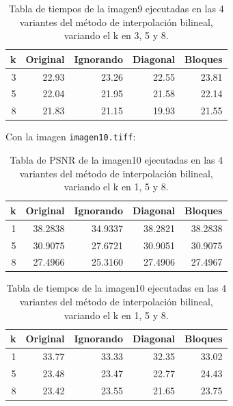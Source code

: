 \documentclass[a4paper]{article}
\newcounter{col}
\begin{document}
\begin{table}[H]
\centering
\begin{tabular}{|r|r|r|r|r|}
\hline
\multicolumn{1}{|c|}{k} & \multicolumn{1}{c|}{Original} & \multicolumn{1}{c|}{Ignorando} & \multicolumn{1}{c|}{Diagonal} & \multicolumn{1}{c|}{Bloques} \\ \hline
3 &  22.93 &  23.26 &  22.55 & 23.81 \\ \hline
5 & 22.04 & 21.95 & 21.58 &  22.14 \\ \hline
8 &  21.83 &  21.15 & 19.93 & 21.55 \\ \hline
\end{tabular}
\caption{Tabla de tiempos de la imagen9 ejecutadas en las 4 variantes del m\'etodo de interpolaci\'on bilineal, variando el k en 3, 5 y 8.}
\label{}
\end{table}

Con la imagen \texttt{imagen10.tiff}:\\
\begin{table}[H]
\centering
\begin{tabular}{|r|r|r|r|r|}
\hline
\multicolumn{1}{|c|}{k} & \multicolumn{1}{c|}{Original} & \multicolumn{1}{c|}{Ignorando} & \multicolumn{1}{c|}{Diagonal} & \multicolumn{1}{c|}{Bloques} \\ \hline
1 & 38.2838 & 34.9337 &  38.2821 &  38.2838 \\ \hline
5 & 30.9075 & 27.6721 & 30.9051 &  30.9075\\ \hline
8 &  27.4966 &   25.3160 & 27.4906 &  27.4967 \\ \hline
\end{tabular}
\caption{Tabla de PSNR de la imagen10 ejecutadas en las 4 variantes del m\'etodo de interpolaci\'on bilineal, variando el k en 1, 5 y 8.}
\label{}
\end{table}
\begin{table}[H]
\centering
\begin{tabular}{|r|r|r|r|r|}
\hline
\multicolumn{1}{|c|}{k} & \multicolumn{1}{c|}{Original} & \multicolumn{1}{c|}{Ignorando} & \multicolumn{1}{c|}{Diagonal} & \multicolumn{1}{c|}{Bloques} \\ \hline
1 & 33.77 &  33.33 & 32.35 & 33.02 \\ \hline
5 & 23.48 &  23.47 & 22.77 & 24.43 \\ \hline
8 & 23.42 &  23.55 & 21.65 &  23.75 \\ \hline
\end{tabular}
\caption{Tabla de tiempos de la imagen10 ejecutadas en las 4 variantes del m\'etodo de interpolaci\'on bilineal, variando el k en 1, 5 y 8.}
\label{}
\end{table}
\end{document}

